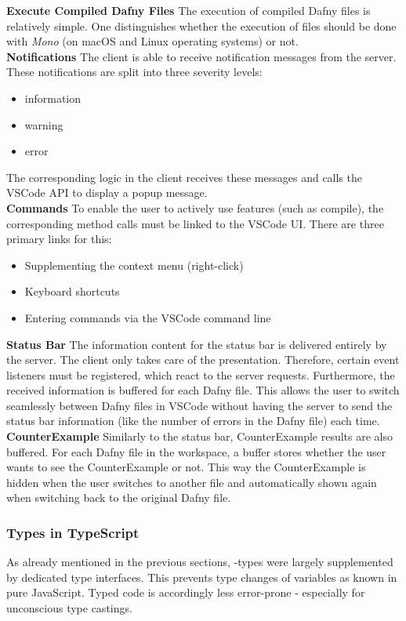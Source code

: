 {\bf Execute Compiled Dafny Files} \textendash{}
The execution of compiled Dafny files is relatively simple.
One distinguishes whether the execution of  files should be done with \textit{Mono} (on macOS and Linux operating systems) or not. \\

{\bf Notifications} \textendash{}
The client is able to receive notification messages from the server.
These notifications are split into three severity levels:
\begin{itemize}
    \item information
    \item warning
    \item error
\end{itemize}
The corresponding logic in the client receives these messages and calls the VSCode API to display a popup message. \\

{\bf Commands} \textendash{}
To enable the user to actively use features (such as compile),
the corresponding method calls must be linked to the VSCode UI.
There are three primary links for this:
\begin{itemize}
    \item Supplementing the context menu (right-click)
    \item Keyboard shortcuts
    \item Entering commands via the VSCode command line
\end{itemize}

{\bf Status Bar} \textendash{}
The information content for the status bar is delivered entirely by the server.
The client only takes care of the presentation.
Therefore, certain event listeners must be registered, which react to the server requests.
Furthermore, the received information is buffered for each Dafny file.
This allows the user to switch seamlessly between Dafny files in VSCode
without having the server to send the status bar information
(like the number of errors in the Dafny file) each time.\\

{\bf CounterExample} \textendash{}
Similarly to the status bar, CounterExample results are also buffered.
For each Dafny file in the workspace, a buffer stores whether the user wants to see the CounterExample or not.
This way the CounterExample is hidden when the user switches to another file
and automatically shown again when switching back to the original Dafny file.

\subsubsection{Types in TypeScript}
As already mentioned in the previous sections, -types were largely supplemented by dedicated type interfaces.
This prevents type changes of variables as known in pure JavaScript.
Typed code is accordingly less error-prone - especially for unconscious type castings. \\

